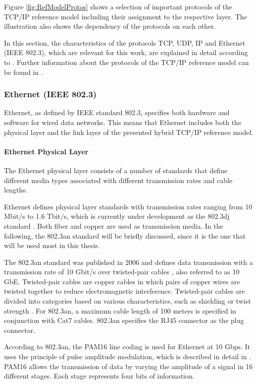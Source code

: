 Figure \ref{fig:RefModelProtos} shows a selection of important protocols of the TCP/IP reference model including their assignment to the respective layer. The illustration also shows the dependency of the protocols on each other.

In this section, the characteristics of the protocols TCP, UDP, IP and Ethernet (IEEE 802.3), which are relevant for this work, are explained in detail according to \cite{Tanenbaum2010}. Further information about the protocols of the TCP/IP reference model can be found in \cite{Tanenbaum2010}.


\subsubsection{Ethernet (IEEE 802.3)}
Ethernet, as defined by IEEE standard 802.3, specifies both hardware and software for wired data networks.  This means that Ethernet includes both the physical layer and the link layer of the presented hybrid TCP/IP reference model.


\paragraph{Ethernet Physical Layer}
The Ethernet physical layer consists of a number of standards that define different media types associated with different transmission rates and cable lengths. 

Ethernet defines physical layer standards with transmission rates ranging from 10 Mbit/s to 1.6 Tbit/s, which is currently under development as the 802.3dj standard \cite{IEEEOpeningPlenary}. Both fiber and copper are used as transmission media. In the following, the 802.3an standard will be briefly discussed, since it is the one that will be used most in this thesis.

The 802.3an standard was published in 2006 and defines data transmission with a transmission rate of 10 Gbit/s over twisted-pair cables \cite{10GigabitEthernet}, also referred to as 10 GbE. Twisted-pair cables are copper cables in which pairs of copper wires are twisted together to reduce electromagnetic interference. Twisted-pair cables are divided into categories based on various characteristics, such as shielding or twist strength \cite{isoiec11801}. For 802.3an, a maximum cable length of 100 meters is specified in conjunction with Cat7 cables. 802.3an specifies the RJ45 connector as the plug connector.

According to 802.3an, the PAM16 line coding is used for Ethernet at 10 Gbps. It uses the principle of pulse amplitude modulation, which is described in detail in \cite{PulseAmplitudeModulation}. PAM16 allows the transmission of data by varying the amplitude of a signal in 16 different stages. Each stage represents four bits of information.

